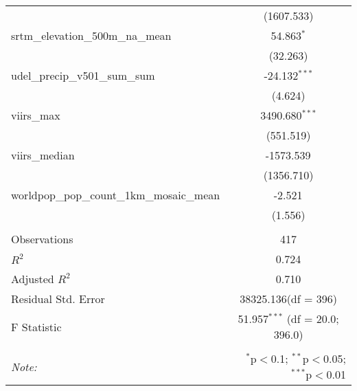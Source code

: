 \begin{table}[!htbp]
\begin{tabular}{@{\extracolsep{5pt}}lc}
  & (1607.533) \\
 srtm_elevation_500m_na_mean & 54.863$^{*}$ \\
  & (32.263) \\
 udel_precip_v501_sum_sum & -24.132$^{***}$ \\
  & (4.624) \\
 viirs_max & 3490.680$^{***}$ \\
  & (551.519) \\
 viirs_median & -1573.539$^{}$ \\
  & (1356.710) \\
 worldpop_pop_count_1km_mosaic_mean & -2.521$^{}$ \\
  & (1.556) \\
\hline \\[-1.8ex]
 Observations & 417 \\
 $R^2$ & 0.724 \\
 Adjusted $R^2$ & 0.710 \\
 Residual Std. Error & 38325.136(df = 396)  \\
 F Statistic & 51.957$^{***}$ (df = 20.0; 396.0) \\
\hline
\hline \\[-1.8ex]
\textit{Note:} & \multicolumn{1}{r}{$^{*}$p$<$0.1; $^{**}$p$<$0.05; $^{***}$p$<$0.01} \\
\end{tabular}
\end{table}